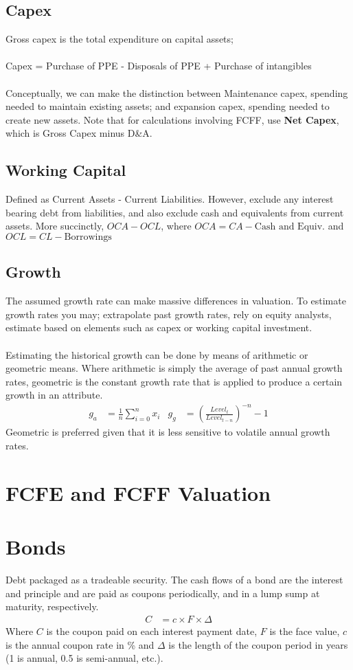 \documentclass[a4paper]{article}
\begin{document}
\subsection{Capex}
Gross capex is the total expenditure on capital assets;\\\\
%
Capex = Purchase of PPE - Disposals of PPE + Purchase of intangibles\\\\
%
%
Conceptually, we can make the distinction between Maintenance capex,
spending needed to maintain existing assets; and expansion capex,
spending needed to create new assets. Note that for calculations
involving FCFF, use \textbf{Net Capex}, which is Gross Capex minus D\&A.
\subsection{Working Capital}
Defined as Current Assets - Current Liabilities. However, exclude any interest
bearing debt from liabilities, and also exclude cash and equivalents from
current assets. More succinctly, $OCA - OCL$, where $OCA = CA - \text{Cash and Equiv.}$
and $OCL = CL - \text{Borrowings}$

\subsection{Growth}
The assumed growth rate can make massive differences in valuation. To estimate
growth rates you may; extrapolate past growth rates, rely on equity analysts,
estimate based on elements such as capex or working capital investment. \\\\
%
%
Estimating the historical growth can be done by means of arithmetic or geometric
means. Where arithmetic is simply the average of past annual growth rates,
geometric is the constant growth rate that is applied to produce a certain
growth in an attribute.
\begin{align*}
g_a &= \frac{1}{n} \sum_{i=0}^{n} x_i & g_g &= (\frac{Level_t}{Level_{t-n}})^{-n} - 1
\end{align*}
Geometric is preferred given that it is less sensitive to volatile annual
growth rates.

\section{FCFE and FCFF Valuation}
\section{Bonds}
Debt packaged as a tradeable security. The cash flows of a bond are the
interest and principle and are paid as coupons periodically, and in a lump
sump at maturity, respectively.
\begin{align*}
C &= c \times F \times \Delta
\end{align*}
Where $C$ is the coupon paid on each interest payment date, 
$F$ is the face value,
$c$ is the
annual coupon rate in \% and $\Delta$ is the length of the coupon period in
years (1 is annual, 0.5 is semi-annual, etc.).
\end{document}
